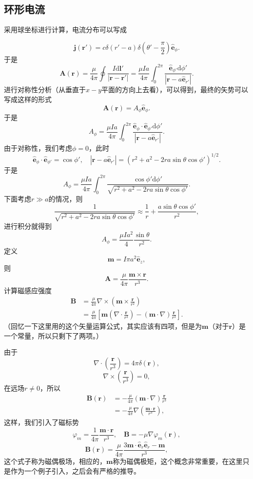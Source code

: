 \documentclass[UTF8]{ctexbook}
\renewcommand{\d}{\mathrm{d}}
\renewcommand{\b}{\boldsymbol}
\numberwithin{equation}{chapter}
\begin{document}
	\subsection{环形电流}
	采用球坐标进行计算，电流分布可以写成
	\begin{figure}[H]
		\centering
	\end{figure}
	\[\b{j}(\b{r}')=c\delta(r'-a)\delta(\theta'-\frac{\pi}{2})\hat{\b{e}}_\phi.\]
	于是
	\[\b{A}(\b{r})=\frac{\mu}{4\pi}\oint \frac{I\d\b{l}'}{|\b{r}-\b{r}'|}=\frac{\mu I a}{4\pi}\int_0^{2\pi}\frac{\hat{\b{e}}_{\phi'}\d\phi'}{|\b{r}-a\hat{\b{e}}_{r'}|}.\]
	进行对称性分析（从垂直于$x-y$平面的方向上去看），可以得到，最终的矢势可以写成这样的形式
	\[\b{A}(\b{r})=A_\phi\hat{\b{e}}_\phi.\]
	于是
	\[A_\phi=\frac{\mu I a}{4\pi}\int_0^{2\pi}\frac{\hat{\b{e}}_\phi\cdot\hat{\b{e}}_{\phi'}\d\phi'}{|\b{r}-a\hat{\b{e}}_{r'}|}.\]
	由于对称性，我们考虑$\phi=0$，此时
	\[\hat{\b{e}}_\phi\cdot\hat{\b{e}}_{\phi'}=\cos\phi',\quad|\b{r}-a\hat{\b{e}}_{r'}|=(r^2+a^2-2ra\sin\theta\cos\phi')^{1/2}. \]
	于是
	\[A_\phi=\frac{\mu Ia}{4\pi}\int_0^{2\pi}\frac{\cos\phi'\d \phi'}{\sqrt{r^2+a^2-2ra\sin\theta\cos\phi'}}.\]
	下面考虑$r\gg a$的情况，则
	\[\frac{1}{\sqrt{r^2+a^2-2ra\sin\theta\cos\phi'}}\approx \frac{1}{r}+\frac{a\sin\theta\cos\phi'}{r^2},\]
	进行积分就得到
	\[A_\phi=\frac{\mu Ia^2}{4}\frac{\sin\theta}{r^2}.\]
	定义
	\[\b{m}=I\pi a^2\hat{\b{e}}_z,\]
	则
	\[\b{A}=\frac{\mu}{4\pi}\frac{\b{m}\times\b{r}}{r^3}.\]
	计算磁感应强度
	\begin{align*}
		\b{B}&=\frac{\mu}{4\pi}\nabla\times\left(\b{m}\times\frac{\b{r}}{r^2}\right) \\
		&=\frac{\mu}{4\pi}\left[\b{m}\left(\nabla\cdot\frac{\b{r}}{r^3}\right)-(\b{m}\cdot\nabla)\frac{\b{r}}{r^3}\right].
	\end{align*}
	（回忆一下这里用的这个矢量运算公式，其实应该有四项，但是为$\b{m}$（对于$\b{r}$）是一个常量，所以只剩下了两项。）
	
	由于
	\[\nabla\cdot\left(\frac{\b{r}}{r^3}\right)=4\pi\delta(\b{r}),\]
		\[\nabla\times\left(\frac{\b{r}}{r^3}\right)=0,\]
	在远场$r\neq0$，所以
	\begin{align*}
		\b{B}(\b{r})&=-\frac{\mu}{4\pi}(\b{m}\cdot\nabla)\frac{\b{r}}{r^3} \\
		&=-\frac{\mu}{4\pi}\nabla\left(\frac{\b{m}\cdot\b{r}}{r^3}\right),
	\end{align*}
	这样，我们引入了磁标势
	\[\varphi_m=\frac{1}{4\pi}\frac{\b{m}\cdot\b{r}}{r^3},\quad \b{B}=-\mu\nabla\varphi_m(\b{r}),\]
	\[\b{B}(\b{r})=\frac{\mu}{4\pi}\frac{3\b{m}\cdot\hat{\b{e}}_r\hat{\b{e}}_r-\b{m}}{r^3},\]
	这个式子称为磁偶极场，相应的，$\b{m}$称为磁偶极矩，这个概念非常重要，在这里只是作为一个例子引入，之后会有严格的推导。
	
\end{document}
